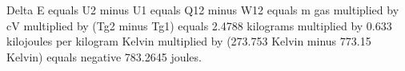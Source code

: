 Delta E equals U2 minus U1 equals Q12 minus W12 equals m gas multiplied by cV multiplied by (Tg2 minus Tg1) equals 2.4788 kilograms multiplied by 0.633 kilojoules per kilogram Kelvin multiplied by (273.753 Kelvin minus 773.15 Kelvin) equals negative 783.2645 joules.